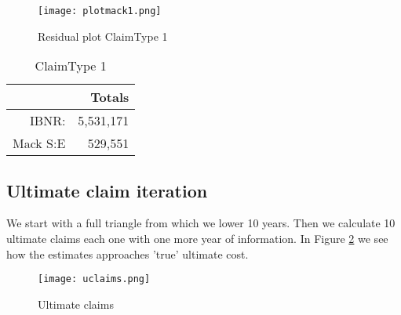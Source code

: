 \documentclass[a4paper]{article}
\begin{document}
 \begin{figure}[H]
 \center
  \texttt{[image: plotmack1.png]}
  \caption{Residual plot ClaimType 1}
  \label{fig:mack1}
\end{figure}



\begin{table}[!ht]
\center
\begin{tabular}{rr}
	& Totals \\ 
\hline
IBNR: & 5,531,171 \\
Mack S:E & 529,551\\
\hline
\end{tabular}
\caption{ClaimType 1} \label{tab:mack1}
\end{table}


\subsection*{Ultimate claim iteration}

We start with a full triangle from which we lower 10 years. Then we calculate 10 ultimate claims each one with one more year of information.
In Figure \ref{fig:ultimate} we see how the estimates approaches 'true' ultimate cost.
 \begin{figure}[H]
 \center
  \texttt{[image: uclaims.png]}
  \caption{Ultimate claims}
  \label{fig:ultimate}
\end{figure}


%
\end{document}
